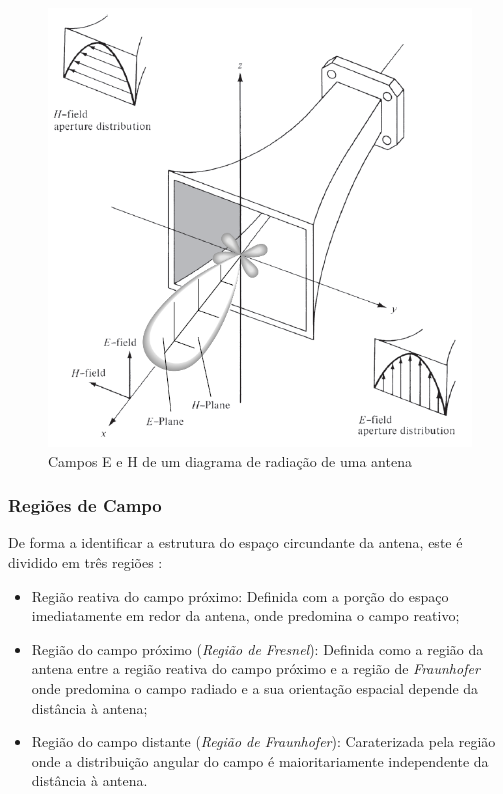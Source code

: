 \begin{figure}[h]
\centering
\includegraphics[scale=0.6]{chapters/ch3/assets/campoEH_piramidal}
\caption[Campos E e H de um diagrama de radiação de uma antena]{Campos E e H de um diagrama de radiação de uma antena}
\label{fig:campoEH_piramidal}
\end{figure}

\subsubsection*{Regiões de Campo}
De forma a identificar a estrutura do espaço circundante da antena, este é dividido em três regiões \parencite{Kraus1988}:
\begin{itemize}
\item Região reativa do campo próximo: Definida com a porção do espaço imediatamente em redor da antena, onde predomina o campo reativo;
\item Região do campo próximo (\textit{Região de Fresnel}): Definida como a região da antena entre a região reativa do campo próximo e a região de \textit{Fraunhofer} onde predomina o campo radiado e a sua orientação espacial depende da distância à antena;
\item Região do campo distante (\textit{Região de Fraunhofer}): Caraterizada pela região onde a distribuição angular do campo é maioritariamente independente da distância à antena.
\end{itemize}

